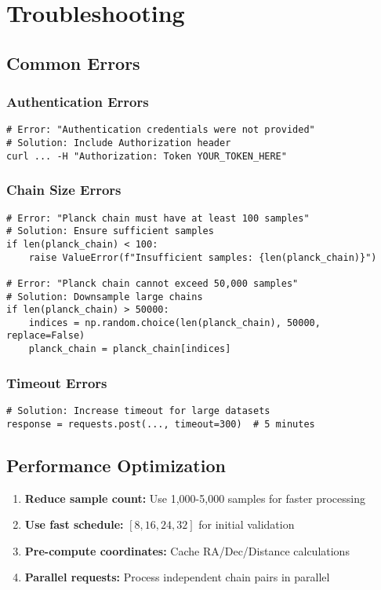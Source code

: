 \documentclass[11pt]{article}
\begin{document}
\section{Troubleshooting}

\subsection{Common Errors}

\subsubsection{Authentication Errors}
\begin{lstlisting}[style=bash]
# Error: "Authentication credentials were not provided"
# Solution: Include Authorization header
curl ... -H "Authorization: Token YOUR_TOKEN_HERE"
\end{lstlisting}

\subsubsection{Chain Size Errors}
\begin{lstlisting}[style=python]
# Error: "Planck chain must have at least 100 samples"
# Solution: Ensure sufficient samples
if len(planck_chain) < 100:
    raise ValueError(f"Insufficient samples: {len(planck_chain)}")

# Error: "Planck chain cannot exceed 50,000 samples"
# Solution: Downsample large chains
if len(planck_chain) > 50000:
    indices = np.random.choice(len(planck_chain), 50000, replace=False)
    planck_chain = planck_chain[indices]
\end{lstlisting}

\subsubsection{Timeout Errors}
\begin{lstlisting}[style=python]
# Solution: Increase timeout for large datasets
response = requests.post(..., timeout=300)  # 5 minutes
\end{lstlisting}

\subsection{Performance Optimization}

\begin{enumerate}
    \item \textbf{Reduce sample count:} Use 1,000-5,000 samples for faster processing
    \item \textbf{Use fast schedule:} $[8, 16, 24, 32]$ for initial validation
    \item \textbf{Pre-compute coordinates:} Cache RA/Dec/Distance calculations
    \item \textbf{Parallel requests:} Process independent chain pairs in parallel
\end{enumerate}
\end{document}
